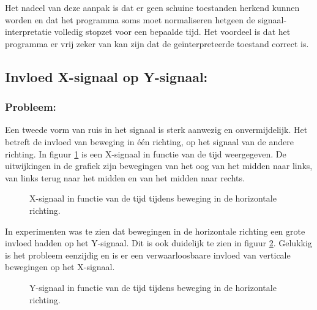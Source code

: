 \documentclass{article}
\newcommand{\figwidth}{0.85\linewidth}
\begin{document}
Het nadeel van deze aanpak is dat er geen schuine toestanden herkend kunnen worden en dat het programma soms moet normaliseren hetgeen de signaal-interpretatie volledig stopzet voor een bepaalde tijd. Het voordeel is dat het programma er vrij zeker van kan zijn dat de ge\"interpreteerde toestand correct is.

\subsection{Invloed X-signaal op Y-signaal:}
\subsubsection{Probleem:}
Een tweede vorm van ruis in het signaal is sterk aanwezig en onvermijdelijk. Het betreft de invloed van beweging in \'e\'en richting, op het signaal van de andere richting. In figuur \ref{fig:grafiekgevoeligheidY_2} is een X-signaal in functie van de tijd weergegeven. De uitwijkingen in de grafiek zijn bewegingen van het oog van het midden naar links, van links terug naar het midden en van het midden naar rechts.
\begin{figure}[H]
	\centering
	\caption{X-signaal in functie van de tijd tijdens beweging in de horizontale richting.}
	\label{fig:grafiekgevoeligheidY_2}
\end{figure}
In experimenten was te zien dat bewegingen in de horizontale richting een grote invloed hadden op het Y-signaal. Dit is ook duidelijk te zien in figuur \ref{fig:grafiekgevoeligheidY_1}. Gelukkig is het probleem eenzijdig en is er een verwaarloosbaare invloed van verticale bewegingen op het X-signaal.\\
\begin{figure}[H]	
	\centering
	\caption{Y-signaal in functie van de tijd tijdens beweging in de horizontale richting.}
	\label{fig:grafiekgevoeligheidY_1}
\end{figure}
\end{document}
